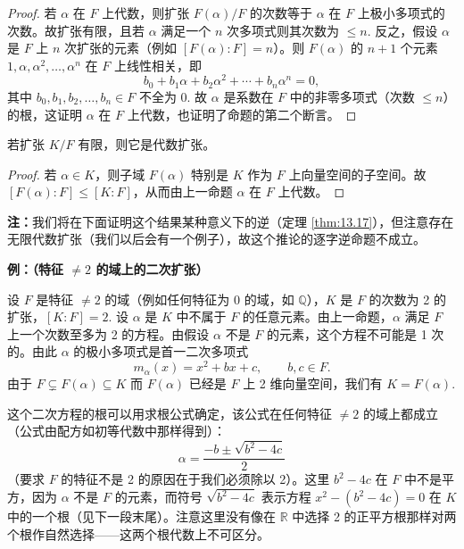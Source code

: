 \begin{proof}
若 \(\alpha\) 在 \(F\) 上代数，则扩张 \(F(\alpha)/F\) 的次数等于 \(\alpha\) 在 \(F\) 上极小多项式的次数。故扩张有限，且若 \(\alpha\) 满足一个 \(n\) 次多项式则其次数为 \(\leq n\). 反之，假设 \(\alpha\) 是 \(F\) 上 \(n\) 次扩张的元素（例如 \([F(\alpha):F] = n\)）。则 \(F(\alpha)\) 的 \(n+1\) 个元素 \(1, \alpha, \alpha^2, \ldots, \alpha^n\) 在 \(F\) 上线性相关，即
\[
b_0+b_1\alpha+b_2\alpha^2+\cdots+b_n\alpha^n = 0,
\]
其中 \(b_0, b_1, b_2, \ldots, b_n \in F\) 不全为 0. 故 \(\alpha\) 是系数在 \(F\) 中的非零多项式（次数 \(\leq n\)）的根，这证明 \(\alpha\) 在 \(F\) 上代数，也证明了命题的第二个断言。
\end{proof}

\begin{corollary}\label{cor:13.13}
若扩张 \(K/F\) 有限，则它是代数扩张。
\end{corollary}

\begin{proof}
若 \(\alpha \in K\)，则子域 \(F(\alpha)\) 特别是 \(K\) 作为 \(F\) 上向量空间的子空间。故 \([F(\alpha):F] \leq [K:F]\)，从而由上一命题 \(\alpha\) 在 \(F\) 上代数。
\end{proof}

\noindent\textbf{注：}我们将在下面证明这个结果某种意义下的逆（定理 \ref{thm:13.17}），但注意存在无限代数扩张（我们以后会有一个例子），故这个推论的逐字逆命题不成立。

\noindent\textbf{例：（特征 \(\neq 2\) 的域上的二次扩张）}

设 \(F\) 是特征 \(\neq 2\) 的域（例如任何特征为 0 的域，如 \(\mathbb{Q}\)），\(K\) 是 \(F\) 的次数为 2 的扩张，\([K:F] = 2\). 设 \(\alpha\) 是 \(K\) 中不属于 \(F\) 的任意元素。由上一命题，\(\alpha\) 满足 \(F\) 上一个次数至多为 2 的方程。由假设 \(\alpha\) 不是 \(F\) 的元素，这个方程不可能是 1 次的。由此 \(\alpha\) 的极小多项式是首一二次多项式
\[
m_\alpha(x) = x^2+bx+c, \qquad b, c \in F.
\]
由于 \(F \subsetneq F(\alpha) \subseteq K\) 而 \(F(\alpha)\) 已经是 \(F\) 上 2 维向量空间，我们有 \(K = F(\alpha)\).

这个二次方程的根可以用求根公式确定，该公式在任何特征 \(\neq 2\) 的域上都成立（公式由配方如初等代数中那样得到）：
\[
\alpha = \frac{-b \pm \sqrt{b^2-4c}}{2}
\]
（要求 \(F\) 的特征不是 2 的原因在于我们必须除以 2）。这里 \(b^2-4c\) 在 \(F\) 中不是平方，因为 \(\alpha\) 不是 \(F\) 的元素，而符号 \(\sqrt{b^2-4c}\) 表示方程 \(x^2-(b^2-4c) = 0\) 在 \(K\) 中的一个根（见下一段末尾）。注意这里没有像在 \(\mathbb{R}\) 中选择 2 的正平方根那样对两个根作自然选择——这两个根代数上不可区分。

